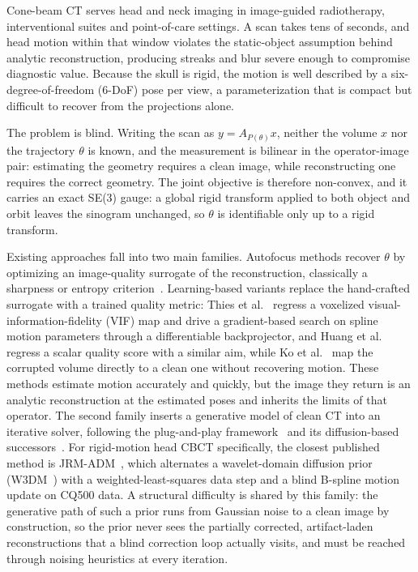 \documentclass[11pt]{article}
\begin{document}
Cone-beam CT serves head and neck imaging in image-guided radiotherapy, interventional suites
and point-of-care settings. A scan takes tens of seconds, and head motion within that window
violates the static-object assumption behind analytic reconstruction, producing streaks and
blur severe enough to compromise diagnostic value. Because the skull is rigid, the motion is
well described by a six-degree-of-freedom (6-DoF) pose per view, a parameterization that is
compact but difficult to recover from the projections alone.

The problem is blind. Writing the scan as $y = A_{P(\theta)}x$, neither the volume $x$ nor the
trajectory $\theta$ is known, and the measurement is bilinear in the operator-image pair:
estimating the geometry requires a clean image, while reconstructing one requires the correct
geometry. The joint objective is therefore non-convex, and it carries an exact SE(3) gauge: a
global rigid transform applied to both object and orbit leaves the sinogram unchanged, so
$\theta$ is identifiable only up to a rigid transform.

Existing approaches fall into two main families. Autofocus methods recover $\theta$ by
optimizing an image-quality surrogate of the reconstruction, classically a sharpness or
entropy criterion~\cite{sisniega17}. Learning-based variants replace the hand-crafted
surrogate with a trained quality metric: Thies et al.~\cite{thies25} regress a voxelized
visual-information-fidelity (VIF) map and drive a gradient-based search on spline motion
parameters through a differentiable backprojector, and Huang et al.~\cite{huang22} regress a
scalar quality score with a similar aim, while Ko et al.~\cite{ko21} map the corrupted volume
directly to a clean one without recovering motion. These methods estimate motion accurately
and quickly, but the image they return is an analytic reconstruction at the estimated poses
and inherits the limits of that operator. The second family inserts a generative model of
clean CT into an iterative solver, following the plug-and-play framework~\cite{pnp13} and its
diffusion-based successors~\cite{dds24}. For rigid-motion head CBCT specifically, the closest
published method is JRM-ADM~\cite{depaepe25}, which alternates a wavelet-domain diffusion
prior (W3DM~\cite{wdm24}) with a weighted-least-squares data step and a blind B-spline motion
update on CQ500 data. A structural difficulty is shared by this family: the generative path of
such a prior runs from Gaussian noise to a clean image by construction, so the prior never
sees the partially corrected, artifact-laden reconstructions that a blind correction loop
actually visits, and must be reached through noising heuristics at every iteration.
\end{document}
